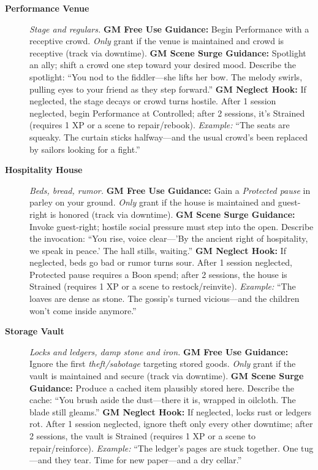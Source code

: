 \begin{description}
  \item[\textbf{Performance Venue}]   
        \emph{Stage and regulars.}  
        \textbf{GM Free Use Guidance:} Begin Performance with a receptive crowd. \emph{Only} grant if the venue is maintained and crowd is receptive (track via downtime).  
        \textbf{GM Scene Surge Guidance:} Spotlight an ally; shift a crowd one step toward your desired mood. Describe the spotlight: ``You nod to the fiddler---she lifts her bow. The melody swirls, pulling eyes to your friend as they step forward.''  
        \textbf{GM Neglect Hook:} If neglected, the stage decays or crowd turns hostile. After 1 session neglected, begin Performance at Controlled; after 2 sessions, it's Strained (requires 1 XP or a scene to repair/rebook).  
        \textit{Example:} ``The seats are squeaky. The curtain sticks halfway---and the usual crowd's been replaced by sailors looking for a fight.''  

  \item[\textbf{Hospitality House}]   
        \emph{Beds, bread, rumor.}  
        \textbf{GM Free Use Guidance:} Gain a \emph{Protected pause} in parley on your ground. \emph{Only} grant if the house is maintained and guest-right is honored (track via downtime).  
        \textbf{GM Scene Surge Guidance:} Invoke guest-right; hostile social pressure must step into the open. Describe the invocation: ``You rise, voice clear---'By the ancient right of hospitality, we speak in peace.' The hall stills, waiting.''  
        \textbf{GM Neglect Hook:} If neglected, beds go bad or rumor turns sour. After 1 session neglected, Protected pause requires a Boon spend; after 2 sessions, the house is Strained (requires 1 XP or a scene to restock/reinvite).  
        \textit{Example:} ``The loaves are dense as stone. The gossip's turned vicious---and the children won't come inside anymore.''  

  \item[\textbf{Storage Vault}]   
        \emph{Locks and ledgers, damp stone and iron.}  
        \textbf{GM Free Use Guidance:} Ignore the first \emph{theft/sabotage} targeting stored goods. \emph{Only} grant if the vault is maintained and secure (track via downtime).  
        \textbf{GM Scene Surge Guidance:} Produce a cached item plausibly stored here. Describe the cache: ``You brush aside the dust---there it is, wrapped in oilcloth. The blade still gleams.''  
        \textbf{GM Neglect Hook:} If neglected, locks rust or ledgers rot. After 1 session neglected, ignore theft only every other downtime; after 2 sessions, the vault is Strained (requires 1 XP or a scene to repair/reinforce).  
        \textit{Example:} ``The ledger's pages are stuck together. One tug---and they tear. Time for new paper---and a dry cellar.''  


\end{description}
